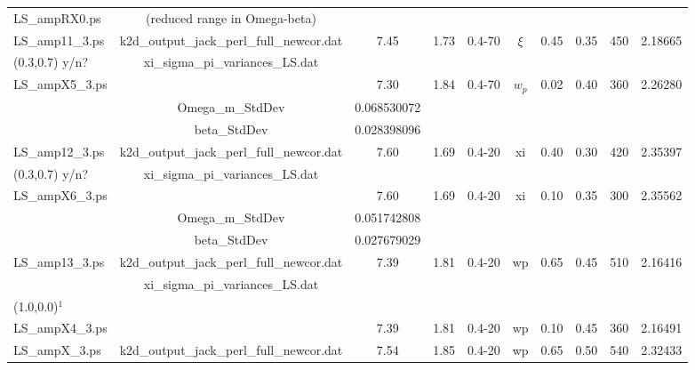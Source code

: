 \documentclass[usenatbib]{mn2e}
\begin{document}
\begin{table*}
\begin{center}
\begin{tabular}{lccccccccc}
%
LS\_ampRX0.ps   & (reduced range in Omega-beta)             &               &         &          &         &       &      &      & \\[8pt]
%
%
LS\_amp11\_3.ps	& k2d\_output\_jack\_perl\_full\_newcor.dat & 7.45          & 1.73 &  0.4-70 & $\xi$ & 0.45  & 0.35  & 450  & 2.18665 \\
(0.3,0.7) y/n?  & xi\_sigma\_pi\_variances\_LS.dat          &               &      &         &       &       &       &      & \\
%
LS\_ampX5\_3.ps	&                                           & 7.30          & 1.84 &  0.4-70 & $w_p$ & 0.02  & 0.40  & 360  &  2.26280\\
		& Omega\_m\_StdDev                          & 0.068530072   &      &         &       &       &       &      & \\
		& beta\_StdDev                              & 0.028398096   &      &         &       &       &       &      & \\[8pt]
%
%
LS\_amp12\_3.ps	& k2d\_output\_jack\_perl\_full\_newcor.dat & 7.60          & 1.69 &  0.4-20 & xi   & 0.40   & 0.30 & 420  & 2.35397 \\
(0.3,0.7) y/n?  & xi\_sigma\_pi\_variances\_LS.dat          &               &      &         &      &        &      &      & \\
%
LS\_ampX6\_3.ps	&                                           & 7.60          & 1.69 &  0.4-20 & xi   & 0.10   & 0.35 & 300  &	2.35562 \\
		& Omega\_m\_StdDev                          & 0.051742808   &      &         &      &        &      &      & \\
		& beta\_StdDev                              & 0.027679029   &      &         &      &        &      &      & \\[8pt]
%
%
LS\_amp13\_3.ps	& k2d\_output\_jack\_perl\_full\_newcor.dat &  7.39         & 1.81 &  0.4-20 & wp   & 0.65  & 0.45  & 510  & 2.16416 \\
                & xi\_sigma\_pi\_variances\_LS.dat          &               &      &         &      &       &       &      & \\
(1.0,0.0)$^1$   &                                           &               &      &         &      &       &       &      & \\
%
LS\_ampX4\_3.ps	&                                           &  7.39         & 1.81 &  0.4-20 & wp   & 0.10  & 0.45  & 360  & 2.16491 \\[8pt]
%
%
LS\_ampX\_3.ps  & k2d\_output\_jack\_perl\_full\_newcor.dat & 7.54	    & 1.85 &  0.4-20 & wp   & 0.65  & 0.50  & 540  & 2.32433 \\

\end{tabular}
\end{center}
\end{table*}
\end{document}
